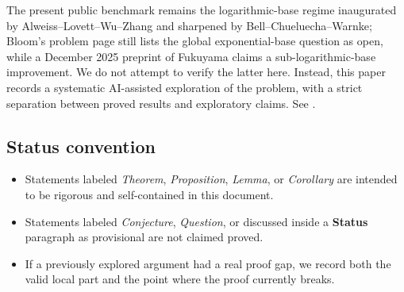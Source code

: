 \documentclass[11pt]{article}
\theoremstyle{definition}
\newcommand{\1}{\mathbf{1}}
\begin{document}
The present public benchmark remains the logarithmic-base regime inaugurated by Alweiss--Lovett--Wu--Zhang and sharpened by Bell--Chueluecha--Warnke; Bloom's problem page still lists the global exponential-base question as open, while a December 2025 preprint of Fukuyama claims a sub-logarithmic-base improvement. We do not attempt to verify the latter here. Instead, this paper records a systematic AI-assisted exploration of the problem, with a strict separation between proved results and exploratory claims. See \cite{ErdosRado1960,ALWZ2020,Rao2020,BCW2021,Bloom2026,Fukuyama2025,Rao2025}.

\subsection*{Status convention}
\begin{itemize}[leftmargin=2em]
\item Statements labeled \emph{Theorem}, \emph{Proposition}, \emph{Lemma}, or \emph{Corollary} are intended to be rigorous and self-contained in this document.
\item Statements labeled \emph{Conjecture}, \emph{Question}, or discussed inside a \textbf{Status} paragraph as provisional are not claimed proved.
\item If a previously explored argument had a real proof gap, we record both the valid local part and the point where the proof currently breaks.
\end{itemize}
\end{document}
